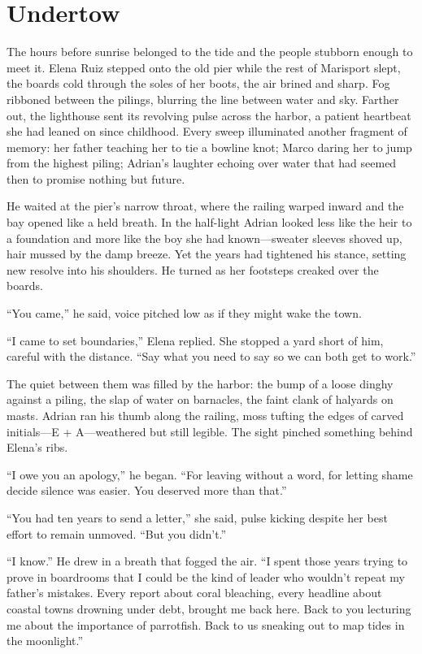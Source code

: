 \chapter{Undertow}

The hours before sunrise belonged to the tide and the people stubborn enough to meet it. Elena Ruiz stepped onto the old pier while the rest of Marisport slept, the boards cold through the soles of her boots, the air brined and sharp. Fog ribboned between the pilings, blurring the line between water and sky. Farther out, the lighthouse sent its revolving pulse across the harbor, a patient heartbeat she had leaned on since childhood. Every sweep illuminated another fragment of memory: her father teaching her to tie a bowline knot; Marco daring her to jump from the highest piling; Adrian’s laughter echoing over water that had seemed then to promise nothing but future.

He waited at the pier’s narrow throat, where the railing warped inward and the bay opened like a held breath. In the half-light Adrian looked less like the heir to a foundation and more like the boy she had known—sweater sleeves shoved up, hair mussed by the damp breeze. Yet the years had tightened his stance, setting new resolve into his shoulders. He turned as her footsteps creaked over the boards.

“You came,” he said, voice pitched low as if they might wake the town.

“I came to set boundaries,” Elena replied. She stopped a yard short of him, careful with the distance. “Say what you need to say so we can both get to work.”

The quiet between them was filled by the harbor: the bump of a loose dinghy against a piling, the slap of water on barnacles, the faint clank of halyards on masts. Adrian ran his thumb along the railing, moss tufting the edges of carved initials—E + A—weathered but still legible. The sight pinched something behind Elena’s ribs.

“I owe you an apology,” he began. “For leaving without a word, for letting shame decide silence was easier. You deserved more than that.”

“You had ten years to send a letter,” she said, pulse kicking despite her best effort to remain unmoved. “But you didn’t.”

“I know.” He drew in a breath that fogged the air. “I spent those years trying to prove in boardrooms that I could be the kind of leader who wouldn’t repeat my father’s mistakes. Every report about coral bleaching, every headline about coastal towns drowning under debt, brought me back here. Back to you lecturing me about the importance of parrotfish. Back to us sneaking out to map tides in the moonlight.”

